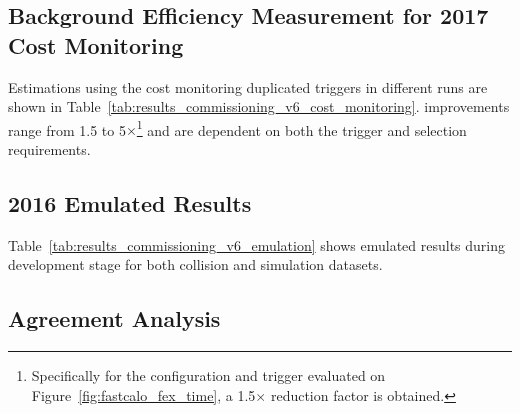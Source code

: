 \FloatBarrier

%
%
%
\subsection{Background Efficiency Measurement for 2017
Cost Monitoring}\label{ssec:2017_cost_background_eff}

Estimations using the cost monitoring duplicated triggers in different
runs are shown in Table~\ref{tab:results_commissioning_v6_cost_monitoring}.
\rnn improvements range from 1.5 to 5$\times$\footnote{Specifically
for the configuration and trigger evaluated on
Figure~\ref{fig:fastcalo_fex_time}, a 1.5$\times$ reduction factor is obtained.}
and are dependent on both the trigger \et and selection requirements.





\FloatBarrier
\subsection{2016 Emulated Results}%

Table~\ref{tab:results_commissioning_v6_emulation} shows emulated results during
development stage for both collision and simulation datasets.



\FloatBarrier
\subsection{Agreement Analysis }%
\label{ssec:agreement_extra}

